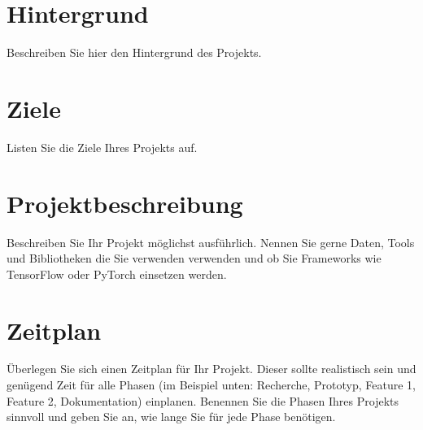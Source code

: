 \documentclass[a4paper, 11pt]{scrartcl}
\title{\Large \thema}
\author{\large \name \\ \large \matnr \\ \large \href{mailto:\email}{\email}}
\date{\large \datum}
\begin{document}
\maketitle
\thispagestyle{empty}

\section{Hintergrund}
Beschreiben Sie hier den Hintergrund des Projekts.

\section{Ziele}
Listen Sie die Ziele Ihres Projekts auf.

\section{Projektbeschreibung}
Beschreiben Sie Ihr Projekt möglichst ausführlich. Nennen Sie gerne Daten, Tools und Bibliotheken die Sie verwenden verwenden und ob Sie Frameworks wie TensorFlow \cite{tensorflow2015} oder PyTorch \cite{pytorch2019} einsetzen werden.

\section{Zeitplan}
Überlegen Sie sich einen Zeitplan für Ihr Projekt. Dieser sollte realistisch sein und genügend Zeit für alle Phasen (im Beispiel unten: Recherche, Prototyp, Feature 1, Feature 2, Dokumentation) einplanen.
Benennen Sie die Phasen Ihres Projekts sinnvoll und geben Sie an, wie lange Sie für jede Phase benötigen.

\noindent %
\end{document}

